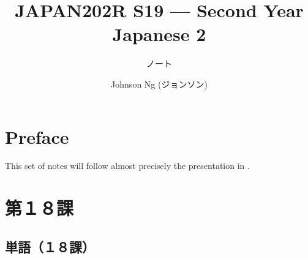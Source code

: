 \documentclass[notoc,notitlepage]{tufte-book}
\title{JAPAN202R S19 --- Second Year Japanese 2}
\author{Johnson Ng (ジョンソン)}
\subtitle{ノート}
\begin{document}
% 
\makeatletter
\fancyhead[LE]{\thepage \enspace \textsl{\leftmark}}
\makeatother

\hypersetup{pageanchor=false}
\maketitle
\hypersetup{pageanchor=true}
\begin{fullwidth}
\tableofcontents
\end{fullwidth}

\makeatletter
\fancyhead[LE]{\thepage \enspace \textsl{\leftmark \enspace \rightmark}}
\makeatother

\chapter*{Preface}%
\label{chp:preface}

This set of notes will follow almost precisely the presentation in
\citealt{banno1999}.


\chapter{第１８課}%
\label{chp:dai_18_ka}

\section{単語（１８課）}%
\label{sec:tango_c18}
\end{document}
